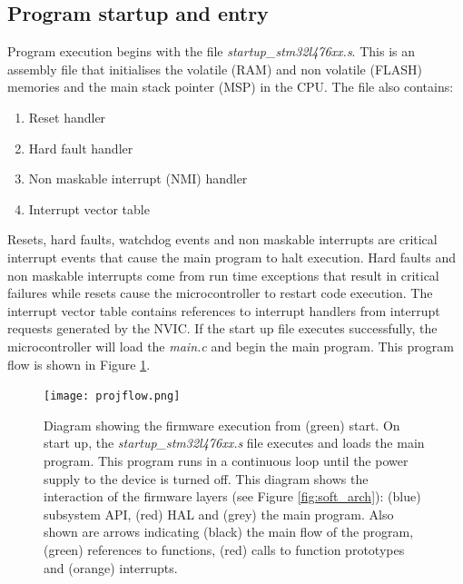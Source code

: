 \subsection{Program startup and entry}

Program execution begins with the file \textit{startup\_stm32l476xx.s}. This is an assembly file that initialises the volatile (RAM) and non volatile (FLASH) memories and the main stack pointer (MSP) in the CPU. The file also contains:

\begin{enumerate}
\item Reset handler
\item Hard fault handler
\item Non maskable interrupt (NMI) handler
\item Interrupt vector table
\end{enumerate}

Resets, hard faults, watchdog events and non maskable interrupts are critical interrupt events that cause the main program to halt execution. Hard faults and non maskable interrupts come from run time exceptions that result in critical failures while resets cause the microcontroller to restart code execution. The interrupt vector table contains references to interrupt handlers from interrupt requests generated by the NVIC. If the start up file executes successfully, the microcontroller will load the \textit{main.c} and begin the main program. This program flow is shown in Figure \ref{fig:progflow}.\par 

\begin{figure}[H]
	\centering
	\texttt{[image: projflow.png]}
	\caption{Diagram showing the firmware execution from (green) start. On start up, the \textit{startup\_stm32l476xx.s} file executes and loads the main program. This program runs in a continuous loop until the power supply to the device is turned off. This diagram shows the interaction of the firmware layers (see Figure \ref{fig:soft_arch}): (blue) subsystem API, (red) HAL and (grey) the main program. Also shown are arrows indicating (black) the main flow of the program, (green) references to functions, (red) calls to function prototypes and (orange) interrupts.}
	\label{fig:progflow}
\end{figure}

